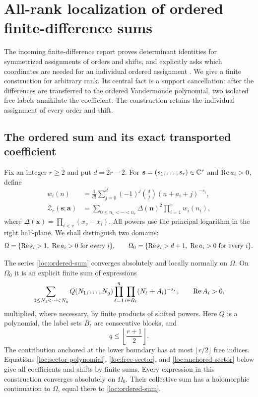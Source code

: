 \section{All-rank localization of ordered finite-difference sums}
\label{sec:localization}

The incoming finite-difference report proves determinant identities for
symmetrized assignments of orders and shifts, and explicitly asks which
coordinates are needed for an individual ordered assignment
\cite[Sections 3 and 9]{repo:finite}.  We give a finite construction for
arbitrary rank.  Its central fact is a support cancellation: after the
differences are transferred to the ordered Vandermonde polynomial, two
isolated free labels annihilate the coefficient.  The construction retains
the individual assignment of every order and shift.

\subsection{The ordered sum and its exact transported coefficient}

Fix an integer $r\ge2$ and put $d=2r-2$.  For
$\mathbf s=(s_1,\ldots,s_r)\in\mathbb C^r$ and
$\operatorname{Re} a_i>0$, define
\begin{align}
 w_i(n)&=\frac1{d!}\sum_{j=0}^{d}(-1)^j\binom dj
                       (n+a_i+j)^{-s_i},
                       \label{loc:weights}\\
 \mathcal Z_r(\mathbf s;\mathbf a)
   &=\sum_{0\le n_1<\cdots<n_r}
          \Delta(\mathbf n)^2\prod_{i=1}^r w_i(n_i),
                       \label{loc:ordered-sum}
\end{align}
where $\Delta(\mathbf x)=\prod_{i<v}(x_v-x_i)$.
All powers use the principal logarithm in the right half-plane.  We shall
distinguish two domains:
\[
 \Omega=\{\operatorname{Re} s_i>1,\ \operatorname{Re} a_i>0\text{ for every }i\},
 \qquad
 \Omega_0=\{\operatorname{Re} s_i>d+1,\ \operatorname{Re} a_i>0\text{ for every }i\}.
\]

\begin{theorem}
\label{loc:main}
The series \eqref{loc:ordered-sum} converges absolutely and locally normally
on $\Omega$.  On $\Omega_0$ it is an explicit finite sum of expressions
\begin{equation}
 \sum_{0\le N_1<\cdots<N_q}
    Q(N_1,\ldots,N_q)
    \prod_{\ell=1}^q\prod_{i\in B_\ell}
                      (N_\ell+A_i)^{-s_i},
 \qquad \operatorname{Re} A_i>0,
 \label{loc:reduced-form}
\end{equation}
multiplied, where necessary, by finite products of shifted powers.
Here $Q$ is a polynomial, the label sets $B_\ell$ are consecutive blocks,
and
\[
 q\le\left\lfloor\frac{r+1}{2}\right\rfloor.
\]
The contribution anchored at the lower boundary has at most
$\lfloor r/2\rfloor$ free indices.  Equations
\eqref{loc:sector-polynomial}, \eqref{loc:free-sector}, and
\eqref{loc:anchored-sector} below give all coefficients and shifts by
finite sums.  Every expression in this construction converges absolutely
on $\Omega_0$.  Their collective sum has a holomorphic continuation to
$\Omega$, equal there to \eqref{loc:ordered-sum}.
\end{theorem}

